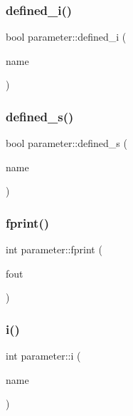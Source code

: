 \mbox{\label{classparameter_a7b6a19a2092d29e4f7a6dd838f18edff}} 
\subsubsection{\texorpdfstring{defined\+\_\+i()}{defined\_i()}}
{\footnotesize\ttfamily bool parameter\+::defined\+\_\+i (\begin{DoxyParamCaption}\item[{string}]{name }\end{DoxyParamCaption})\hspace{0.3cm}{\ttfamily [inline]}}

\mbox{\label{classparameter_a2a48a6fe554cd07b8d2d1859d7aabc90}} 
\subsubsection{\texorpdfstring{defined\+\_\+s()}{defined\_s()}}
{\footnotesize\ttfamily bool parameter\+::defined\+\_\+s (\begin{DoxyParamCaption}\item[{string}]{name }\end{DoxyParamCaption})\hspace{0.3cm}{\ttfamily [inline]}}

\mbox{\label{classparameter_afbef313ca8a9afcdb3d55c15cc26dda9}} 
\subsubsection{\texorpdfstring{fprint()}{fprint()}}
{\footnotesize\ttfamily int parameter\+::fprint (\begin{DoxyParamCaption}\item[{F\+I\+LE $\ast$}]{fout }\end{DoxyParamCaption})}

\mbox{\label{classparameter_aa98e4eadb8cb07d98a6e49ec616552b0}} 
\subsubsection{\texorpdfstring{i()}{i()}}
{\footnotesize\ttfamily int parameter\+::i (\begin{DoxyParamCaption}\item[{string}]{name }\end{DoxyParamCaption})\hspace{0.3cm}{\ttfamily [inline]}}

